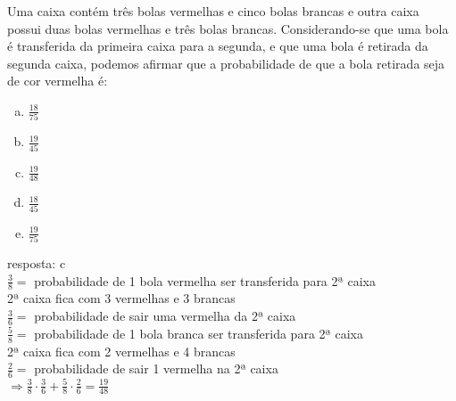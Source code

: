 \begin{ex}
Uma caixa contém três bolas vermelhas e cinco bolas brancas e outra caixa possui duas bolas vermelhas e três bolas brancas. Considerando-se que uma bola é transferida da primeira caixa para a segunda, e que uma bola é retirada da segunda caixa, podemos afirmar que a probabilidade de que a bola retirada seja de cor vermelha é:
   \begin{enumerate}[(a)]
   \item $\frac{18}{75}$
   \item $\frac{19}{45}$
   \item $\frac{19}{48}$
   \item $\frac{18}{45}$
   \item $\frac{19}{75}$
   \end{enumerate}
   \begin{sol}
    resposta: c \\
    $\frac{3}{8}=$ probabilidade de 1 bola vermelha ser transferida para 2ª caixa \\
    2ª caixa fica com 3 vermelhas e 3 brancas\\
    $\frac{3}{6}=$ probabilidade de sair uma vermelha da 2ª caixa \\
    $\frac{5}{8}=$ probabilidade de 1 bola branca ser transferida para 2ª caixa\\
    2ª caixa fica com 2 vermelhas e 4 brancas \\
    $\frac{2}{6}=$ probabilidade de sair 1 vermelha na 2ª caixa \\
    $\Longrightarrow \frac{3}{8}\cdot\frac{3}{6}+\frac{5}{8}\cdot\frac{2}{6}=\frac{19}{48}$
   \end{sol}
\end{ex}